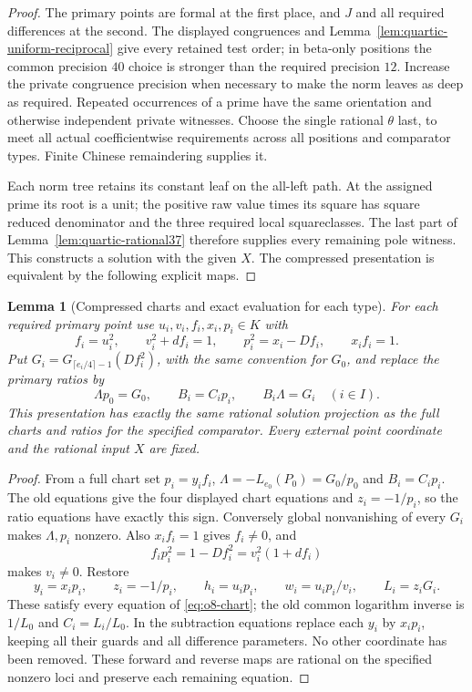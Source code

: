 \documentclass[11pt]{article}
\newtheorem{lemma}[theorem]{Lemma}
\theoremstyle{definition}
\theoremstyle{remark}
\begin{document}
\begin{proof}
The primary points are formal at the first place, and $J$ and all
required differences at the second. The displayed congruences and
Lemma~\ref{lem:quartic-uniform-reciprocal} give every retained test order;
in beta-only positions the common precision $40$ choice is stronger
than the required precision $12$. Increase the private congruence
precision when necessary to make the norm leaves as deep as required.
Repeated occurrences of a prime have the same orientation and otherwise
independent private witnesses. Choose the single rational $\theta$ last,
to meet all actual coefficientwise requirements across all positions
and comparator types. Finite Chinese remaindering supplies it.

Each norm tree retains its constant leaf on the all-left path. At the
assigned prime its root is a unit; the positive raw value times its
square has square reduced denominator and the three required local
squareclasses. The last part of Lemma~\ref{lem:quartic-rational37}
therefore supplies every remaining pole witness. This constructs a
solution with the given $X$. The compressed presentation is equivalent
by the following explicit maps.
\end{proof}

\begin{lemma}[Compressed charts and exact evaluation for each type]
\label{lem:quartic-compressed-primary}
For each required primary point use $u_i,v_i,f_i,x_i,p_i\in K$ with
\[
 f_i=u_i^2,\qquad v_i^2+df_i=1,\qquad
 p_i^2=x_i-Df_i,\qquad x_if_i=1.
\]
Put $G_i=G_{\lceil e_i/4\rceil-1}(Df_i^2)$, with the same convention
for $G_0$, and replace the primary ratios by
\[
 \Lambda p_0=G_0,\qquad B_i=C_ip_i,\qquad B_i\Lambda=G_i
 \quad(i\in I).
\]
This presentation has exactly the same rational solution projection as
the full charts and ratios for the specified comparator. Every external
point coordinate and the rational input $X$ are fixed.
\end{lemma}
\begin{proof}
From a full chart set $p_i=y_if_i$, $\Lambda=-L_{e_0}(P_0)=G_0/p_0$
and $B_i=C_ip_i$. The old equations give the four displayed chart
equations and $z_i=-1/p_i$, so the ratio equations have exactly this sign.
Conversely global nonvanishing of every $G_i$ makes $\Lambda,p_i$
nonzero. Also $x_if_i=1$ gives $f_i\ne0$, and
\[
 f_ip_i^2=1-Df_i^2=v_i^2(1+df_i)
\]
makes $v_i\ne0$. Restore
\[
 y_i=x_ip_i,\qquad z_i=-1/p_i,\qquad
 h_i=u_ip_i,\qquad w_i=u_ip_i/v_i,
 \qquad L_i=z_iG_i.
\]
These satisfy every equation of \eqref{eq:o8-chart}; the old common
logarithm inverse is $1/L_0$ and $C_i=L_i/L_0$.
In the subtraction equations replace each $y_i$ by $x_ip_i$, keeping
all their guards and all difference parameters. No other coordinate
has been removed. These forward and reverse maps are rational on the
specified nonzero loci and preserve each remaining equation.
\end{proof}
\end{document}
